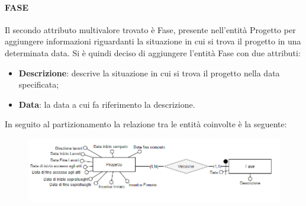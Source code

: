 \documentclass{elegantbook}
\begin{document}
		\paragraph{FASE}
		Il secondo attributo multivalore trovato è Fase, presente nell'entità Progetto per aggiungere informazioni riguardanti la situazione in cui si trova il progetto in una determinata data. Si è quindi deciso di aggiungere l'entità Fase con due attributi:
		\begin{itemize}
			\item \textbf{Descrizione}: descrive la situazione in cui si trova il progetto nella data specificata;
			\item \textbf{Data}: la data a cui fa riferimento la descrizione.
		\end{itemize}
		In seguito al partizionamento la relazione tra le entità coinvolte è la seguente:
		\begin{figure}[H]
			\centering
			\includegraphics[scale=0.5]{../Img/DBSchemes/Fase.png}
		\end{figure}
	
\end{document}
